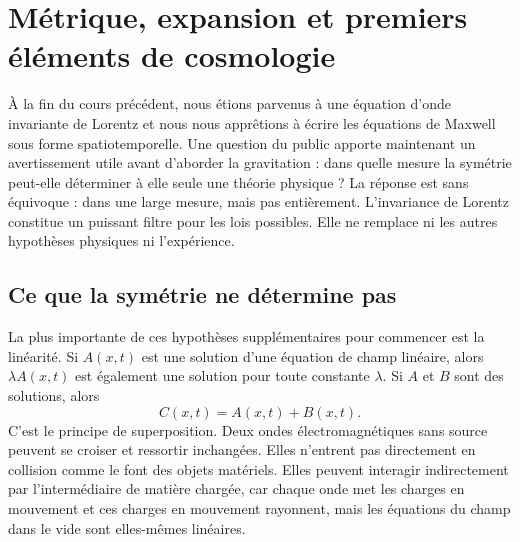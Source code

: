 \chapter{Métrique, expansion et premiers éléments de cosmologie}

À la fin du cours précédent, nous étions parvenus à une équation d’onde invariante de Lorentz et nous nous apprêtions à écrire les équations de Maxwell sous forme spatiotemporelle. Une question du public apporte maintenant un avertissement utile avant d’aborder la gravitation : dans quelle mesure la symétrie peut-elle déterminer à elle seule une théorie physique ? La réponse est sans équivoque : dans une large mesure, mais pas entièrement. L’invariance de Lorentz constitue un puissant filtre pour les lois possibles. Elle ne remplace ni les autres hypothèses physiques ni l’expérience.

\section{Ce que la symétrie ne détermine pas}

\begin{classroomqa}
\end{classroomqa}

La plus importante de ces hypothèses supplémentaires pour commencer est la linéarité. Si \(A(x,t)\) est une solution d’une équation de champ linéaire, alors \(\lambda A(x,t)\) est également une solution pour toute constante \(\lambda\). Si \(A\) et \(B\) sont des solutions, alors \begin{equation}
  C(x,t)=A(x,t)+B(x,t).
  \label{eq:superposition}
\end{equation}
C’est le principe de superposition. Deux ondes électromagnétiques sans source peuvent se croiser et ressortir inchangées. Elles n’entrent pas directement en collision comme le font des objets matériels. Elles peuvent interagir indirectement par l’intermédiaire de matière chargée, car chaque onde met les charges en mouvement et ces charges en mouvement rayonnent, mais les équations du champ dans le vide sont elles-mêmes linéaires.

